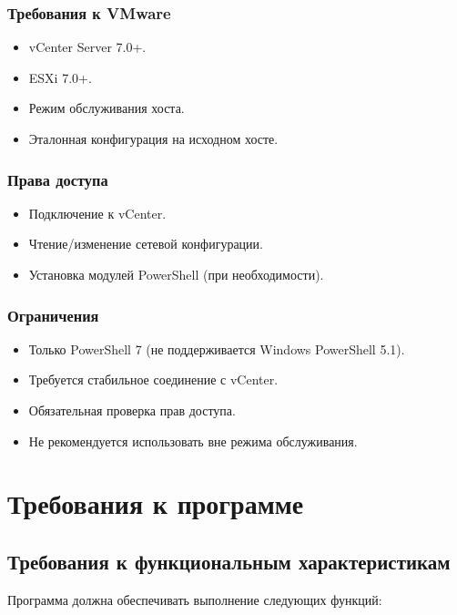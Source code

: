\subsubsection{Требования к VMware}
\begin{itemize}
    \item vCenter Server 7.0+.
    \item ESXi 7.0+.
    \item Режим обслуживания хоста.
    \item Эталонная конфигурация на исходном хосте.
\end{itemize}

\subsubsection{Права доступа}
\begin{itemize}
    \item Подключение к vCenter.
    \item Чтение/изменение сетевой конфигурации.
    \item Установка модулей PowerShell (при необходимости).
\end{itemize}

\subsubsection{Ограничения}
\begin{itemize}
    \item Только PowerShell 7 (не поддерживается Windows PowerShell 5.1).
    \item Требуется стабильное соединение с vCenter.
    \item Обязательная проверка прав доступа.
    \item Не рекомендуется использовать вне режима обслуживания.
\end{itemize}

\section{Требования к программе}

\subsection{Требования к функциональным характеристикам}
Программа должна обеспечивать выполнение следующих функций:


